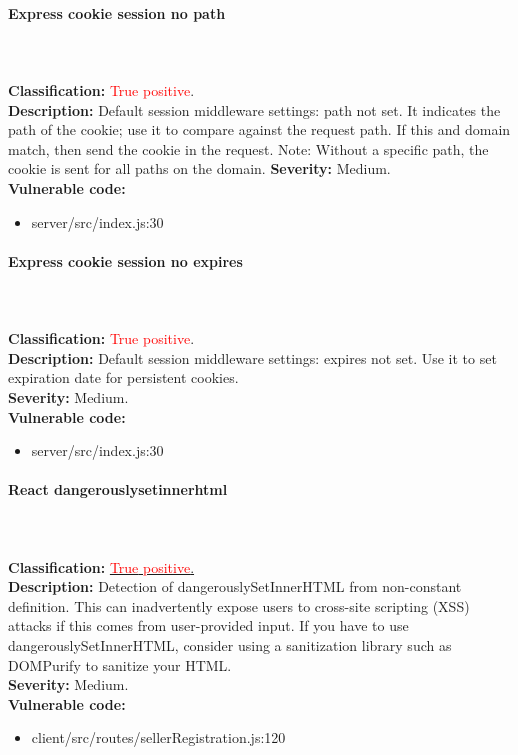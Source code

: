 \documentclass[]{article}
\begin{document}
\paragraph{Express cookie session no path} \mbox{} \\ \\
\textbf{Classification:} \textcolor{red}{True} \textcolor{red}{positive}. \\ 
\textbf{Description:} Default session middleware settings: path not set. It indicates the path of the cookie; use it to compare against the request path. If this and domain match, then send the cookie in the request. 
Note: Without a specific path, the cookie is sent for all paths on the domain.
\textbf{Severity:} Medium. \\ 
\textbf{Vulnerable code:} 
\begin{itemize}
    \item server/src/index.js:30
\end{itemize}

\paragraph{Express cookie session no expires} \mbox{} \\ \\
\textbf{Classification:} \textcolor{red}{True} \textcolor{red}{positive}. \\ 
\textbf{Description:}  Default session middleware settings: expires not set. Use it to set expiration date for persistent cookies. \\ 
\textbf{Severity:} Medium. \\ 
\textbf{Vulnerable code:} 
\begin{itemize}
    \item server/src/index.js:30
\end{itemize}

\paragraph{React dangerouslysetinnerhtml} \mbox{} \\ \\
\textbf{Classification:} \hyperref[par:stored_xss]{\textcolor{red}{True} \textcolor{red}{positive}.} \\ 
\textbf{Description:} Detection of dangerouslySetInnerHTML from non-constant definition. This can 
inadvertently expose users to cross-site scripting (XSS) attacks if this comes from user-provided
input. If you have to use dangerouslySetInnerHTML, consider using a sanitization library such as 
DOMPurify to sanitize your HTML. \\ 
\textbf{Severity:} Medium. \\ 
\textbf{Vulnerable code:} 
\begin{itemize}
    \item client/src/routes/sellerRegistration.js:120
\end{itemize}
\end{document}
